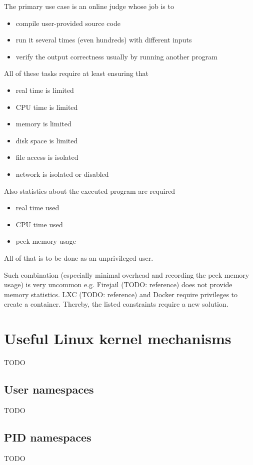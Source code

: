 \documentclass[licencjacka,en]{pracamgr}
\begin{document}
The primary use case is an online judge whose job is to
\begin{itemize}
    \item compile user-provided source code
    \item run it several times (even hundreds) with different inputs
    \item verify the output correctness usually by running another program
\end{itemize}
All of these tasks require at least ensuring that
\begin{itemize}
    \item real time is limited
    \item CPU time is limited
    \item memory is limited
    \item disk space is limited
    \item file access is isolated
    \item network is isolated or disabled
\end{itemize}
Also statistics about the executed program are required
\begin{itemize}
    \item real time used
    \item CPU time used
    \item peek memory usage
\end{itemize}
All of that is to be done as an unprivileged user.

Such combination (especially minimal overhead and recording the peek memory usage) is very uncommon e.g. Firejail (TODO: reference) does not provide memory statistics. LXC (TODO: reference) and Docker require privileges to create a container. Thereby, the listed constraints require a new solution.

\chapter{Useful Linux kernel mechanisms}

TODO

\section{User namespaces}
TODO

\section{PID namespaces}
TODO
\end{document}
